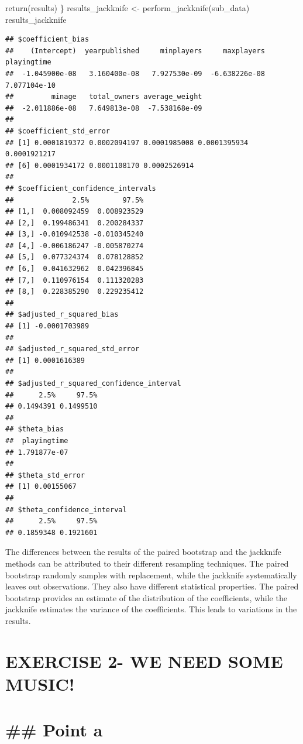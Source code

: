 \documentclass[
]{article}
\newenvironment{Shaded}{\begin{snugshade}}{\end{snugshade}}
\newcommand{\FunctionTok}[1]{\textcolor[rgb]{0.00,0.00,0.00}{#1}}
\newcommand{\NormalTok}[1]{#1}
\newcommand{\OtherTok}[1]{\textcolor[rgb]{0.56,0.35,0.01}{#1}}
\begin{document}
\begin{Shaded}
\begin{Highlighting}[]
  \FunctionTok{return}\NormalTok{(results)}
\NormalTok{\}}
\NormalTok{results\_jackknife }\OtherTok{\textless{}{-}} \FunctionTok{perform\_jackknife}\NormalTok{(sub\_data)}
\NormalTok{results\_jackknife}
\end{Highlighting}
\end{Shaded}

\begin{verbatim}
## $coefficient_bias
##    (Intercept)  yearpublished     minplayers     maxplayers    playingtime 
##  -1.045900e-08   3.160400e-08   7.927530e-09  -6.638226e-08   7.077104e-10 
##         minage   total_owners average_weight 
##  -2.011886e-08   7.649813e-08  -7.538168e-09 
## 
## $coefficient_std_error
## [1] 0.0001819372 0.0002094197 0.0001985008 0.0001395934 0.0001921217
## [6] 0.0001934172 0.0001108170 0.0002526914
## 
## $coefficient_confidence_intervals
##              2.5%        97.5%
## [1,]  0.008092459  0.008923529
## [2,]  0.199486341  0.200284337
## [3,] -0.010942538 -0.010345240
## [4,] -0.006186247 -0.005870274
## [5,]  0.077324374  0.078128852
## [6,]  0.041632962  0.042396845
## [7,]  0.110976154  0.111320283
## [8,]  0.228385290  0.229235412
## 
## $adjusted_r_squared_bias
## [1] -0.0001703989
## 
## $adjusted_r_squared_std_error
## [1] 0.0001616389
## 
## $adjusted_r_squared_confidence_interval
##      2.5%     97.5% 
## 0.1494391 0.1499510 
## 
## $theta_bias
##  playingtime 
## 1.791877e-07 
## 
## $theta_std_error
## [1] 0.00155067
## 
## $theta_confidence_interval
##      2.5%     97.5% 
## 0.1859348 0.1921601
\end{verbatim}

The differences between the results of the paired bootstrap and the
jackknife methods can be attributed to their different resampling
techniques. The paired bootstrap randomly samples with replacement,
while the jackknife systematically leaves out observations. They also
have different statistical properties. The paired bootstrap provides an
estimate of the distribution of the coefficients, while the jackknife
estimates the variance of the coefficients. This leads to variations in
the results.

\hypertarget{exercise-2--we-need-some-music-1}{%
\section{EXERCISE 2- WE NEED SOME
MUSIC!}\label{exercise-2--we-need-some-music-1}}

\hypertarget{point-a-2}{%
\section{\#\# Point a}\label{point-a-2}}
\end{document}
